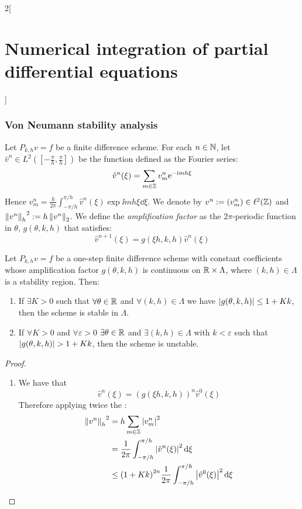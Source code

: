 \documentclass[../../../main_math.tex]{subfiles}
\begin{document}
\begin{multicols}{2}[\section{Numerical integration of partial differential equations}]
  \subsubsection{Von Neumann stability analysis}
  \begin{definition}
    Let $P_{k,h}{v}={f}$ be a finite difference scheme. For each $n\in\mathbb{N}$, let ${\hat{v}}^n\in L^2\left(\left[-\frac{\pi}{h},\frac{\pi}{h}\right]\right)$ be the function defined as the Fourier series: $${\hat{v}}^n(\xi)=\sum_{m\in\mathbb{Z}}{v}_{m}^n\mathrm{e}^{-\mathrm{i} m h \xi}$$ Hence $\displaystyle {v}_m^n=\frac{h}{2\pi}\int_{-\pi/h}^{\pi/h} {\hat{v}}^n(\xi)\exp{\ii mh \xi}\dd{\xi}$. We denote by ${v}^n:=({v}_m^n)\in\ell^2(\mathbb{Z})$ and ${\left\|v^n\right\|_h}^2:=h\left\|v^n\right\|_{2}$. We define the \emph{amplification factor} as the $2\pi$-periodic function in $\theta$, $g(\theta, k, h)$ that satisfies:
    $${\hat{v}}^{n+1}(\xi)=g(\xi h,k,h){\hat{v}}^n(\xi)$$
  \end{definition}
  \begin{theorem}
    Let $P_{k,h}{v}={f}$ be a one-step finite difference scheme with constant coefficients whose amplification factor $g(\theta,k,h)$ is continuous on $\mathbb{R}\times\Lambda$, where $(k,h)\in\Lambda$ is a stability region. Then:
    \begin{enumerate}
      \item If $\exists K>0$ such that $\forall\theta\in\mathbb{R}$ and $\forall(k,h)\in\Lambda$ we have $\abs{g(\theta,k,h)}\leq 1+Kk$, then the scheme is stable in $\Lambda$.
      \item If $\forall K>0$ and $\forall\varepsilon>0$ $\exists\theta\in\mathbb{R}$ and $\exists(k,h)\in\Lambda$ with $k<\varepsilon$ such that $\abs{g(\theta, k,h)}>1+Kk$, then the scheme is unstable.
    \end{enumerate}
  \end{theorem}
  \begin{proof}
    \begin{enumerate}
      \item We have that $${\hat{v}}^{n}(\xi)={(g(\xi h,k,h))}^n{\hat{v}}^0(\xi)$$ Therefore applying twice the :
            \begin{align*}
              {\norm{{v}^n}_h}^2 & =h\sum_{m\in\ZZ}\abs{{v}_m^n}^2                                                     \\
                                 & =\frac{1}{2\pi}\int_{-\pi/h}^{\pi/h} \abs{\hat{v}^n(\xi)}^2\dd{\xi}                 \\
                                 & \leq{(1+Kk)}^{2n}\frac{1}{2\pi}\int_{-\pi/h}^{\pi/h} \abs{\hat{v}^0(\xi)}^2\dd{\xi} \\

\end{align*}
\end{enumerate}
\end{proof}
\end{multicols}
\end{document}
